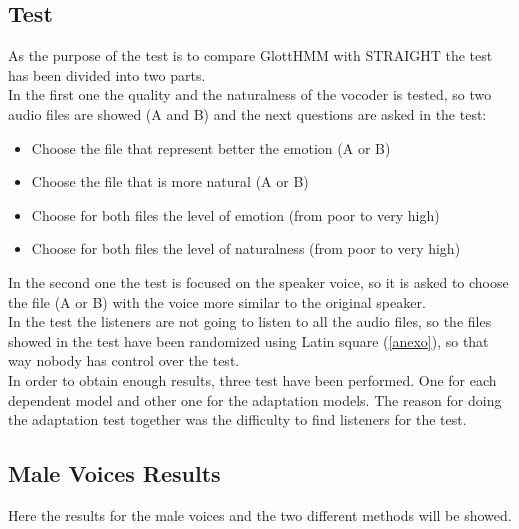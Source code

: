 \subsection{Test}\label{test}
As the purpose of the test is to compare GlottHMM with STRAIGHT the test has been divided into two parts.\\
In the first one the quality and the naturalness of the vocoder is tested, so two audio files are showed (A and B) and the next questions are asked in the test:
\begin{itemize}
	\item Choose the file that represent better the emotion (A or B)
	\item Choose the file that is more natural (A or B)
	\item Choose for both files the level of emotion (from poor to very high)
	\item Choose for both files the level of naturalness (from poor to very high)
\end{itemize}
In the second one the test is focused on the speaker voice, so it is asked to choose the file (A or B) with the voice more similar to the original speaker.\\
In the test the listeners are not going to listen to all the audio files, so the files showed in the test have been randomized using Latin square (\ref{anexo}), so that way nobody has control over the test.\\
In order to obtain enough results, three test have been performed. One for each dependent model and other one for the adaptation models. The reason for doing the adaptation test together was the difficulty to find listeners for the test.\\
\subsection{Male Voices Results}\label{maleres}
Here the results for the male voices and the two different methods will be showed.\\
